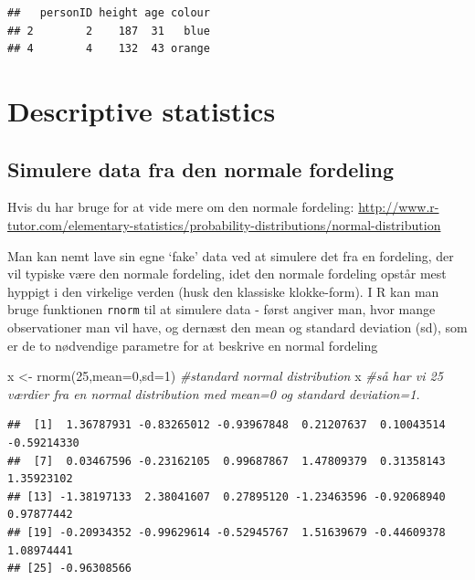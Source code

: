\documentclass[
]{book}
\newenvironment{Shaded}{\begin{snugshade}}{\end{snugshade}}
\newcommand{\AttributeTok}[1]{\textcolor[rgb]{0.77,0.63,0.00}{#1}}
\newcommand{\CommentTok}[1]{\textcolor[rgb]{0.56,0.35,0.01}{\textit{#1}}}
\newcommand{\DecValTok}[1]{\textcolor[rgb]{0.00,0.00,0.81}{#1}}
\newcommand{\FunctionTok}[1]{\textcolor[rgb]{0.00,0.00,0.00}{#1}}
\newcommand{\NormalTok}[1]{#1}
\newcommand{\OtherTok}[1]{\textcolor[rgb]{0.56,0.35,0.01}{#1}}
\begin{document}
\begin{verbatim}
##   personID height age colour
## 2        2    187  31   blue
## 4        4    132  43 orange
\end{verbatim}

\hypertarget{descriptive-statistics}{%
\section{Descriptive statistics}\label{descriptive-statistics}}

\hypertarget{simulere-data-fra-den-normale-fordeling}{%
\subsection{Simulere data fra den normale fordeling}\label{simulere-data-fra-den-normale-fordeling}}

Hvis du har bruge for at vide mere om den normale fordeling: \url{http://www.r-tutor.com/elementary-statistics/probability-distributions/normal-distribution}

Man kan nemt lave sin egne `fake' data ved at simulere det fra en fordeling, der vil typiske være den normale fordeling, idet den normale fordeling opstår mest hyppigt i den virkelige verden (husk den klassiske klokke-form). I R kan man bruge funktionen \texttt{rnorm} til at simulere data - først angiver man, hvor mange observationer man vil have, og dernæst den mean og standard deviation (sd), som er de to nødvendige parametre for at beskrive en normal fordeling

\begin{Shaded}
\begin{Highlighting}[]
\NormalTok{x }\OtherTok{\textless{}{-}} \FunctionTok{rnorm}\NormalTok{(}\DecValTok{25}\NormalTok{,}\AttributeTok{mean=}\DecValTok{0}\NormalTok{,}\AttributeTok{sd=}\DecValTok{1}\NormalTok{) }\CommentTok{\#standard normal distribution}
\NormalTok{x }\CommentTok{\#så har vi 25 værdier fra en normal distribution med mean=0 og standard deviation=1.}
\end{Highlighting}
\end{Shaded}

\begin{verbatim}
##  [1]  1.36787931 -0.83265012 -0.93967848  0.21207637  0.10043514 -0.59214330
##  [7]  0.03467596 -0.23162105  0.99687867  1.47809379  0.31358143  1.35923102
## [13] -1.38197133  2.38041607  0.27895120 -1.23463596 -0.92068940  0.97877442
## [19] -0.20934352 -0.99629614 -0.52945767  1.51639679 -0.44609378  1.08974441
## [25] -0.96308566
\end{verbatim}
\end{document}
